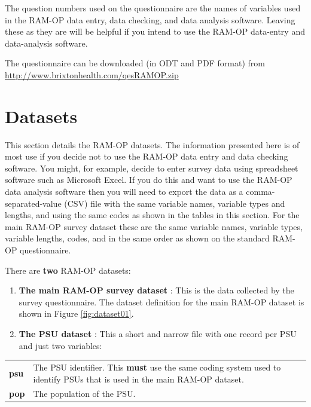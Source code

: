 \documentclass[12pt,a4paper]{book}
\begin{document}
The question numbers used on the questionnaire are the names of variables used in the RAM-OP data entry, data checking, and data analysis software. Leaving these as they are will be helpful if you intend to use the RAM-OP data-entry and data-analysis software.

The questionnaire can be downloaded (in ODT and PDF format) from \url{http://www.brixtonhealth.com/qesRAMOP.zip}

\hypertarget{datasets}{%
\chapter{Datasets}\label{datasets}}

This section details the RAM-OP datasets. The information presented here is of most use if you decide not to use the RAM-OP data entry and data checking software. You might, for example, decide to enter survey data using spreadsheet software such as Microsoft Excel. If you do this and want to use the RAM-OP data analysis software then you will need to export the data as a comma-separated-value (CSV) file with the same variable names, variable types and lengths, and using the same codes as shown in the tables in this section. For the main RAM-OP survey dataset these are the same variable names, variable types, variable lengths, codes, and in the same order as shown on the standard RAM-OP questionnaire.

There are \textbf{two} RAM-OP datasets:

\begin{enumerate}
\def\labelenumi{\arabic{enumi}.}
\item
  \textbf{The main RAM-OP survey dataset} :
  This is the data collected by the survey questionnaire. The dataset definition for the main RAM-OP dataset is shown in Figure \ref{fig:dataset01}.
\item
  \textbf{The PSU dataset} :
  This a short and narrow file with one record per PSU and just two variables:
\end{enumerate}

\begin{longtable}[]{@{}ll@{}}
\toprule
\endhead
\begin{minipage}[t]{0.11\columnwidth}\raggedright
\textbf{psu}\strut
\end{minipage} & \begin{minipage}[t]{0.83\columnwidth}\raggedright
The PSU identifier. This \textbf{must} use the same coding system used to identify
PSUs that is used in the main RAM-OP dataset.\strut
\end{minipage}\tabularnewline
\begin{minipage}[t]{0.11\columnwidth}\raggedright
\textbf{pop}\strut
\end{minipage} & \begin{minipage}[t]{0.83\columnwidth}\raggedright
The population of the PSU.\strut
\end{minipage}\tabularnewline
\bottomrule
\end{longtable}
\end{document}
